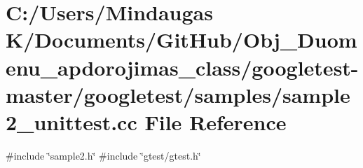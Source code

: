 \hypertarget{googletest-master_2googletest_2samples_2sample2__unittest_8cc}{}\section{C\+:/\+Users/\+Mindaugas K/\+Documents/\+Git\+Hub/\+Obj\+\_\+\+Duomenu\+\_\+apdorojimas\+\_\+class/googletest-\/master/googletest/samples/sample2\+\_\+unittest.cc File Reference}
\label{googletest-master_2googletest_2samples_2sample2__unittest_8cc}
{\ttfamily \#include \char`\"{}sample2.\+h\char`\"{}}\newline
{\ttfamily \#include \char`\"{}gtest/gtest.\+h\char`\"{}}\newline
